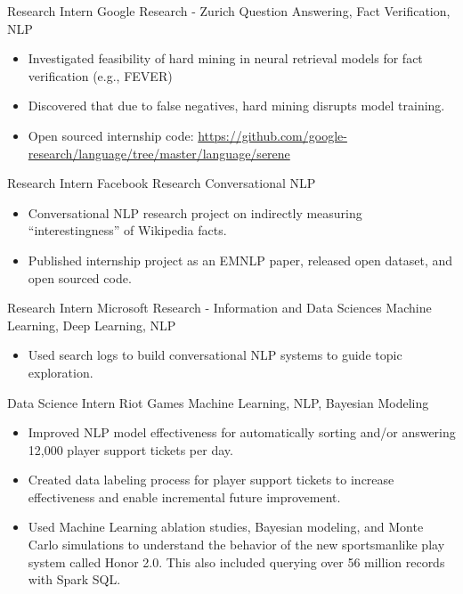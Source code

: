 \documentclass[11pt,a4paper,sans]{moderncv} %
\begin{document}
		{Research Intern}
		{Google Research - Zurich}
		{Question Answering, Fact Verification, NLP}
		{}
		{
			\begin{itemize}
				\item Investigated feasibility of hard mining in neural retrieval models for fact verification (e.g., FEVER)
				\item Discovered that due to false negatives, hard mining disrupts model training.
				\item Open sourced internship code: \href{https://github.com/google-research/language/tree/master/language/serene}{https://github.com/google-research/language/tree/master/language/serene}
			\end{itemize}
		}

		{Research Intern}
		{Facebook Research}
		{Conversational NLP}
		{}
		{
			\begin{itemize}
				\item Conversational NLP research project on indirectly measuring ``interestingness'' of Wikipedia facts.
				\item Published internship project as an EMNLP paper, released open dataset, and open sourced code.
			\end{itemize}
		}

		{Research Intern}
		{Microsoft Research - Information and Data Sciences}
		{Machine Learning, Deep Learning, NLP}
		{}
		{
			\begin{itemize}
			\item Used search logs to build conversational NLP systems to guide topic exploration.
			\end{itemize}
		}
		{Data Science Intern}
		{Riot Games}
		{Machine Learning, NLP, Bayesian Modeling}
		{}
		{
			\begin{itemize}
			\item Improved NLP model effectiveness for automatically sorting and/or answering 12,000 player support tickets per day.
			\item Created data labeling process for player support tickets to increase effectiveness and enable incremental future improvement.
			\item Used Machine Learning ablation studies, Bayesian modeling, and Monte Carlo simulations to understand the behavior of the new sportsmanlike play system called Honor 2.0. This also included querying over 56 million records with Spark SQL.
			\end{itemize}
		}
\end{document}
